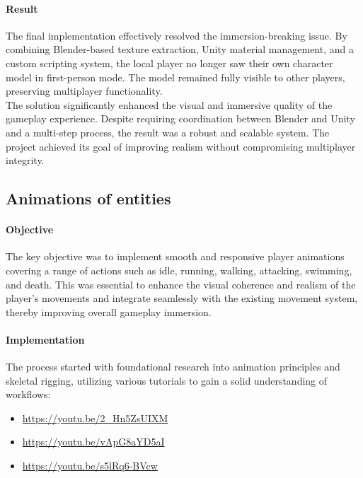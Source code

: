 \documentclass{article}
\begin{document}
\paragraph{Result}\hfill

The final implementation effectively resolved the immersion-breaking issue. By combining Blender-based texture extraction, Unity material management, and a custom scripting system, the local player no longer saw their own character model in first-person mode. The model remained fully visible to other players, preserving multiplayer functionality.\\

The solution significantly enhanced the visual and immersive quality of the gameplay experience. Despite requiring coordination between Blender and Unity and a multi-step process, the result was a robust and scalable system. The project achieved its goal of improving realism without compromising multiplayer integrity.










\newpage
\subsection{Animations of entities}
\paragraph{Objective}\hfill

The key objective was to implement smooth and responsive player animations covering a range of actions such as idle, running, walking, attacking, swimming, and death. This was essential to enhance the visual coherence and realism of the player's movements and integrate seamlessly with the existing movement system, thereby improving overall gameplay immersion.

\paragraph{Implementation}\hfill

The process started with foundational research into animation principles and skeletal rigging, utilizing various tutorials to gain a solid understanding of workflows:
\begin{itemize}
    \item \url{https://youtu.be/2_Hn5ZsUIXM} 
    \item \url{https://youtu.be/vApG8aYD5aI} 
    \item \url{https://youtu.be/s5lRq6-BVcw} 
\end{itemize}
\end{document}

